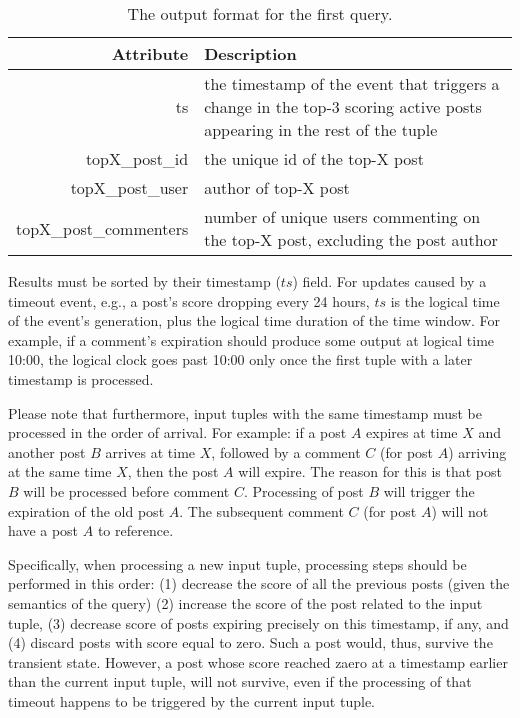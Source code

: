 \documentclass{sig-alternate}
\begin{document}
\begin{table}[ht]
	\caption{The output format for the first query.}
	\centering 
	\begin{tabular}{r p{5.2cm}}
		\toprule
		Attribute		&	 Description\\
		\midrule
		ts			&	the timestamp of the event that triggers a change in the top-3 scoring active posts appearing in the rest of the tuple\\[2ex]
		topX\_post\_id	&	the unique id of the top-X post\\[2ex]		
		topX\_post\_user	& 	 author of top-X post\\[2ex]		
		topX\_post\_commenters & number of unique users commenting on the top-X post, excluding the post author\\[2ex]
		\bottomrule 
	\end{tabular}
	\label{table:query1}
\end{table}

Results must be sorted by their timestamp ($ts$) field. For updates caused by a timeout event, e.g., a post's score dropping every 24 hours, $ts$ is the logical time of the event's generation, plus the logical time duration of the time window. For example, if a comment's expiration should produce some output at logical time 10:00, the logical clock goes past 10:00 only once the first tuple with a later timestamp is processed.

Please note that furthermore, input tuples with the same timestamp must be processed in the order of arrival. For example: if a post $A$ expires at time $X$ and another post $B$ arrives at time $X$, followed by a comment $C$ (for post $A$) arriving at the same time $X$, then the post $A$ will expire. The reason for this is that post $B$ will be processed before comment $C$. Processing of post $B$ will trigger the expiration of the old post $A$. The subsequent comment $C$ (for post $A$) will not have a post $A$ to reference.

Specifically, when processing a new input tuple, processing steps should be performed in this order: (1) decrease the score of all the previous posts (given the semantics of the query) (2) increase the score of the post related to the input tuple, (3) decrease score of posts expiring precisely on this timestamp, if any, and (4) discard posts with score equal to zero. Such a post would, thus, survive the transient state. However, a post whose score reached zaero at a timestamp earlier than the current input tuple, will not survive, even if the processing of that timeout happens to be triggered by the current input tuple. 
\end{document}
